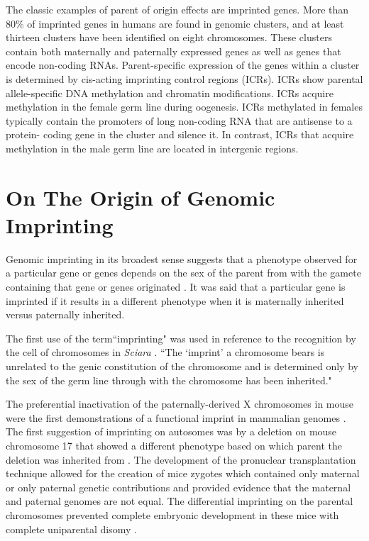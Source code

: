 The classic examples of parent of origin effects are imprinted genes. More than 80\% of imprinted genes in humans are found in genomic clusters, and at least thirteen clusters have been identified on eight chromosomes\cite{Lawson2013,Peters2014,Pires2014,Abramowitz2012}. These clusters contain both maternally and paternally expressed genes as well as genes that encode non-coding RNAs\cite{Peters2014,Abramowitz2012}. Parent-specific expression of the genes within a cluster is determined by cis-acting imprinting control regions (ICRs). ICRs show parental allele-specific DNA methylation and chromatin modifications. ICRs acquire methylation in the female germ line during oogenesis. ICRs methylated in females typically contain the promoters of long non-coding RNA that are antisense to a protein- coding gene in the cluster and silence it. In contrast, ICRs that acquire methylation in the male germ line are located in intergenic regions.

\section{On The Origin of Genomic Imprinting }

Genomic imprinting in its broadest sense suggests that a phenotype observed for a particular gene or genes depends on the sex of the parent from with the gamete containing that gene or genes originated \cite{Sapienza:1989vm}. It was said that a particular gene is imprinted if it results in a different phenotype when it is maternally inherited versus paternally inherited.

The first use of the term``imprinting" was used in reference to the recognition by the cell of chromosomes in \textit{Sciara} \cite{Crouse:1960vc,Sapienza:1989vm}. ``The `imprint' a chromosome bears is unrelated to the genic constitution of the chromosome and is determined only by the sex of the germ line through with the chromosome has been inherited." \cite{Crouse:1960vc} 

The preferential inactivation of the paternally-derived X chromosomes in mouse were the first demonstrations of a functional imprint in mammalian genomes \cite{Takagi:1975ua,Lyon:1984gh,Chandra:1975tb}. The first suggestion of imprinting on autosomes was by a deletion on mouse chromosome 17 that showed a different phenotype based on which parent the deletion was inherited from \cite{Johnson:1974uf,Johnson:1974kc}. The development of the pronuclear transplantation technique allowed for the creation of mice zygotes which contained only maternal or only paternal genetic contributions and provided evidence that the maternal and paternal genomes are not equal. The differential imprinting on the parental chromosomes prevented complete embryonic development in these mice with complete uniparental disomy \cite{Sapienza:1989vm,McGrath:1984ky}. 

